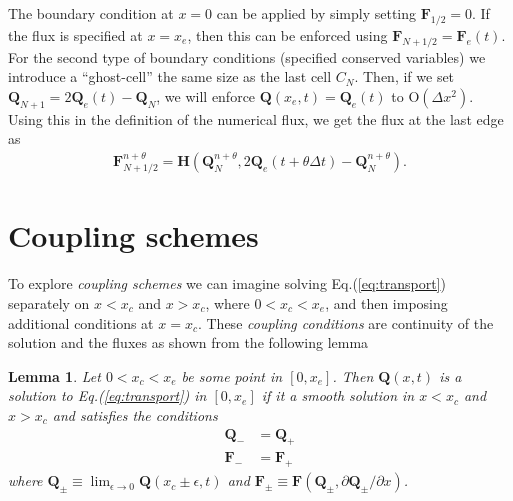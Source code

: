 \documentclass[reqno]{amsart}
\newcommand{\eqr}[1]{Eq.\thinspace(#1)}
\newcommand{\pfracb}[2]{\partial #1/\partial #2}
\newcommand{\mvec}[1]{\mathbf{#1}}
\newtheorem{lem}{Lemma}
\theoremstyle{definition}
\begin{document}
The boundary condition at $x=0$ can be applied by simply setting
$\mvec{F}_{1/2}=0$. If the flux is specified at $x=x_e$, then this can
be enforced using $\mvec{F}_{N+1/2}=\mvec{F}_e(t)$. For the second
type of boundary conditions (specified conserved variables) we
introduce a ``ghost-cell'' the same size as the last cell $C_N$. Then,
if we set $\mvec{Q}_{N+1} = 2\mvec{Q}_e(t) - \mvec{Q}_N$, we will
enforce $\mvec{Q}(x_e,t) = \mvec{Q}_e(t)$ to $\textrm{O}(\Delta
x^2)$. Using this in the definition of the numerical flux, we get the
flux at the last edge as
\begin{align}
  \mvec{F}_{N+1/2}^{n+\theta} = \mvec{H}(\mvec{Q}_N^{n+\theta},
  2\mvec{Q}_e(t+\theta\Delta t) - \mvec{Q}_N^{n+\theta}).
\end{align}

\section{Coupling schemes}

To explore \emph{coupling schemes} we can imagine solving
\eqr{\ref{eq:transport}} separately on $x<x_c$ and $x>x_c$, where
$0<x_c<x_e$, and then imposing additional conditions at $x=x_c$. These
\emph{coupling conditions} are continuity of the solution and the
fluxes as shown from the following lemma
\begin{lem}
  \label{lem:couple-conditions}
  Let $0<x_c<x_e$ be some point in $[0,x_e]$. Then $\mvec{Q}(x,t)$ is
  a solution to \eqr{\ref{eq:transport}} in $[0,x_e]$ if it a smooth
  solution in $x<x_c$ and $x>x_c$ and satisfies the conditions
  \begin{align}
    \mvec{Q}_- &= \mvec{Q}_+ \\
    \mvec{F}_- &= \mvec{F}_+
  \end{align}
  where $\mvec{Q}_\pm \equiv \lim_{\epsilon\rightarrow
    0}\mvec{Q}(x_c\pm\epsilon,t)$ and $\mvec{F}_\pm \equiv
  \mvec{F}(\mvec{Q}_\pm,\pfracb{\mvec{Q}_\pm}{x})$.
\end{lem}
\end{document}
